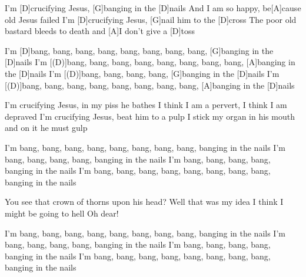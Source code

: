 

\begin{guitar}
	I'm [D]crucifying Jesus, [G]banging in the [D]nails
	And I am so happy, be[A]cause old Jesus failed
	I'm [D]crucifying Jesus, [G]nail him to the [D]cross
	The poor old bastard bleeds to death and [A]I don't give a [D]toss
	
	I'm [D]bang, bang, bang, bang, bang, bang, bang, bang, [G]banging in the [D]nails
	I'm [(D)]bang, bang, bang, bang, bang, bang, bang, bang, [A]banging in the [D]nails
	I'm [(D)]bang, bang, bang, bang, [G]banging in the [D]nails
	I'm [(D)]bang, bang, bang, bang, bang, bang, bang, bang, [A]banging in the [D]nails
	
	I'm crucifying Jesus, in my piss he bathes
	I think I am a pervert, I think I am depraved
	I'm crucifying Jesus, beat him to a pulp
	I stick my organ in his mouth and on it he must gulp
	
	I'm bang, bang, bang, bang, bang, bang, bang, bang, banging in the nails
	I'm bang, bang, bang, bang, banging in the nails
	I'm bang, bang, bang, bang, banging in the nails
	I'm bang, bang, bang, bang, bang, bang, bang, bang, banging in the nails
	
	You see that crown of thorns upon his head?
	Well that was my idea
	I think I might be going to hell
	Oh dear!
	
	I'm bang, bang, bang, bang, bang, bang, bang, bang, banging in the nails
	I'm bang, bang, bang, bang, banging in the nails
	I'm bang, bang, bang, bang, banging in the nails
	I'm bang, bang, bang, bang, bang, bang, bang, bang, banging in the nails
\end{guitar}